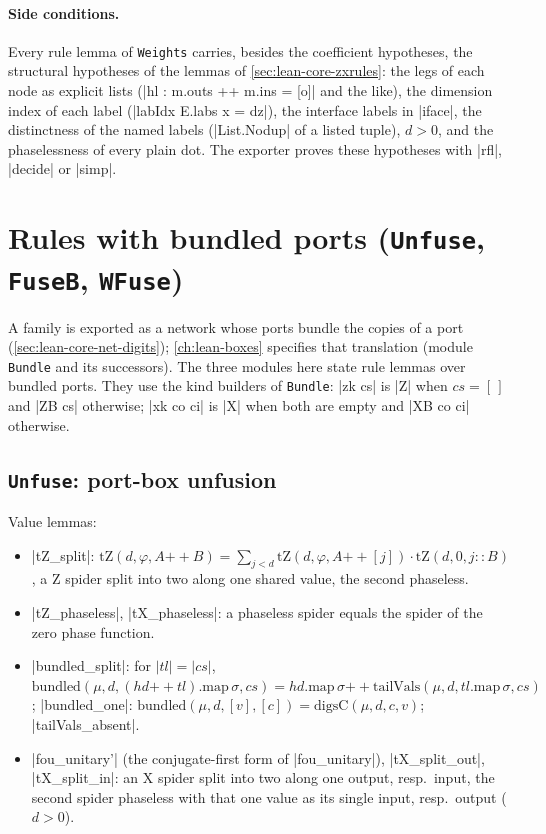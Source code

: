 \paragraph{Side conditions.} Every rule lemma of \texttt{Weights} carries, besides the coefficient
hypotheses, the structural hypotheses of the lemmas of \cref{sec:lean-core-zxrules}: the legs of
each node as explicit lists (\lean|hl : m.outs ++ m.ins = [o]| and the like), the dimension index
of each label (\lean|labIdx E.labs x = dz|), the interface labels in \lean|iface|, the distinctness
of the named labels (\lean|List.Nodup| of a listed tuple), $d>0$, and the phaselessness of every
plain dot. The exporter proves these hypotheses with \lean|rfl|, \lean|decide| or \lean|simp|.

\section{Rules with bundled ports (\texttt{Unfuse}, \texttt{FuseB}, \texttt{WFuse})}\label{sec:lean-core-bundled}

A \bbox{} family is exported as a network whose ports bundle the copies of a port
(\cref{sec:lean-core-net-digits}); \cref{ch:lean-boxes} specifies that translation (module
\texttt{Bundle} and its successors). The three modules here state rule lemmas over bundled ports.
They use the kind builders of \texttt{Bundle}: \lean|zk cs| is \lean|Z| when $cs=[\,]$ and
\lean|ZB cs| otherwise; \lean|xk co ci| is \lean|X| when both are empty and \lean|XB co ci|
otherwise.

\subsection{\texttt{Unfuse}: port-box unfusion}

Value lemmas:
\begin{itemize}
\item \lean|tZ_split|: $\mathrm{tZ}(d,\varphi,A\mathbin{+\!\!+}B)=\sum_{j<d}\mathrm{tZ}(d,\varphi,A\mathbin{+\!\!+}[j])\cdot
  \mathrm{tZ}(d,0,j{::}B)$, a Z spider split into two along one shared value, the second phaseless.
\item \lean|tZ_phaseless|, \lean|tX_phaseless|: a phaseless spider equals the spider of the zero phase
  function.
\item \lean|bundled_split|: for $|tl|=|cs|$,
  $\mathrm{bundled}(\mu,d,(hd\mathbin{+\!\!+}tl).\mathrm{map}\,\sigma,cs)=hd.\mathrm{map}\,\sigma\mathbin{+\!\!+}
  \mathrm{tailVals}(\mu,d,tl.\mathrm{map}\,\sigma,cs)$; \lean|bundled_one|:
  $\mathrm{bundled}(\mu,d,[v],[c])=\mathrm{digsC}(\mu,d,c,v)$; \lean|tailVals_absent|.
\item \lean|fou_unitary'| (the conjugate-first form of \lean|fou_unitary|), \lean|tX_split_out|,
  \lean|tX_split_in|: an X spider split into two along one output, resp.\ input, the second spider
  phaseless with that one value as its single input, resp.\ output ($d>0$).
\end{itemize}

